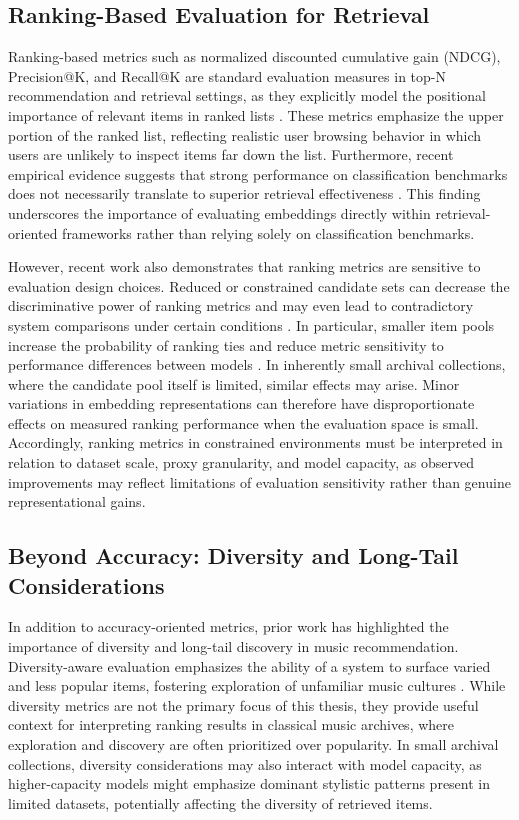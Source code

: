 \subsection{Ranking-Based Evaluation for Retrieval}
Ranking-based metrics such as normalized discounted cumulative gain (NDCG), Precision@K, and Recall@K are standard evaluation measures in top-N recommendation and retrieval settings, as they explicitly model the positional importance of relevant items in ranked lists \cite{krichene2020}. 
These metrics emphasize the upper portion of the ranked list, reflecting realistic user browsing behavior in which users are unlikely to inspect items far down the list.
Furthermore, recent empirical evidence suggests that strong performance on classification benchmarks does not necessarily translate to superior retrieval effectiveness \cite{tamm2024}. 
This finding underscores the importance of evaluating embeddings directly within retrieval-oriented frameworks rather than relying solely on classification benchmarks.

However, recent work also demonstrates that ranking metrics are sensitive to evaluation design choices. Reduced or constrained candidate sets can decrease the discriminative power of ranking metrics and may even lead to contradictory system comparisons under certain conditions \cite{krichene2020, canamares2020}. 
In particular, smaller item pools increase the probability of ranking ties and reduce metric sensitivity to performance differences between models \cite{canamares2020}.
In inherently small archival collections, where the candidate pool itself is limited, similar effects may arise. Minor variations in embedding representations can therefore have disproportionate effects on measured ranking performance when the evaluation space is small. 
Accordingly, ranking metrics in constrained environments must be interpreted in relation to dataset scale, proxy granularity, and model capacity, as observed improvements may reflect limitations of evaluation sensitivity rather than genuine representational gains.

\subsection{Beyond Accuracy: Diversity and Long-Tail Considerations}
In addition to accuracy-oriented metrics, prior work has highlighted the importance of diversity and long-tail discovery in music recommendation.
Diversity-aware evaluation emphasizes the ability of a system to surface varied and less popular items, fostering exploration of unfamiliar music cultures \cite{porcaro2022}.
While diversity metrics are not the primary focus of this thesis, they provide useful context for interpreting ranking results in classical music archives, where exploration and discovery are often prioritized over popularity.
In small archival collections, diversity considerations may also interact with model capacity, as higher-capacity models might emphasize dominant stylistic patterns present in limited datasets, potentially affecting the diversity of retrieved items.



